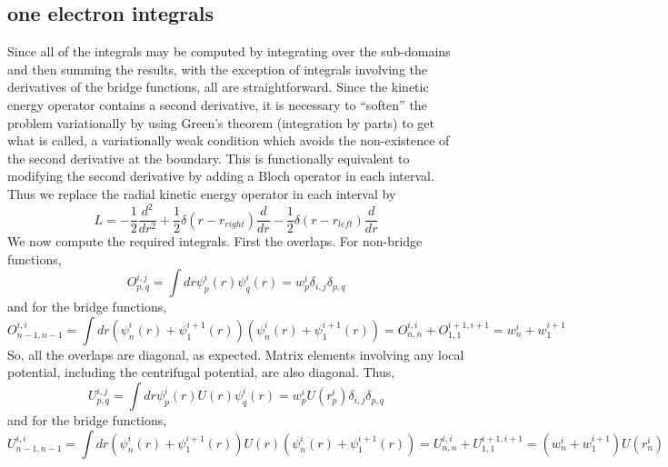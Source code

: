 \documentclass[preprint,showpacs,preprintnumbers,amsmath,amssymb]{revtex4}
\begin{document}
\subsection{one electron integrals}
Since all of the integrals may be computed by integrating over the 
sub-domains and then summing the results, with the exception of integrals 
involving the derivatives of the bridge functions, all are straightforward.
Since the kinetic energy operator contains a second derivative, it is 
necessary to ``soften'' the problem variationally by using Green's theorem 
(integration by parts) to get what is called, a variationally weak 
condition which avoids the non-existence of the second derivative at the 
boundary.  This is functionally equivalent to modifying the second 
derivative by adding a Bloch operator in each interval.  Thus we replace the
radial kinetic energy operator in each interval by
\begin{equation}
 L = -\frac{1}{2} \frac{d^2}{dr^{2}}  
                    + \frac{1}{2} \delta(r-r_{right}) \frac{d}{dr} 
                    - \frac{1}{2} \delta(r-r_{left}) \frac{d}{dr} 
\end{equation}
We now compute the required integrals.  First the overlaps.  For non-bridge 
functions,
\begin{equation}
    O^{i,j}_{p,q} = \int dr \psi^{i}_{p}(r) \psi^{i}_{q}(r)
                = w^{i}_{p} \delta_{i,j} \delta_{p,q}
\end{equation}
and for the bridge functions, 
\begin{equation}
        O^{i,i}_{n-1,n-1} = \int dr ( \psi^{i}_{n}(r) + \psi^{i+1}_{1}(r) )
                        ( \psi^{i}_{n}(r) + \psi^{i+1}_{1}(r) )
              = O^{i,i}_{n,n} + O^{i+1,i+1}_{1,1}
              = w^{i}_{n} + w^{i+1}_{1}
\end{equation}
So, all the overlaps are diagonal, as expected.
Matrix elements involving any local potential, including the centrifugal
potential, are also diagonal.  Thus,
\begin{equation}
    U^{i,j}_{p,q} = \int dr \psi^{i}_{p}(r) U(r) \psi^{i}_{q}(r)
                = w^{i}_{p} U(r^{i}_{p}) \delta_{i,j} \delta_{p,q}
\end{equation}
and for the bridge functions, 
\begin{equation}
        U^{i,i}_{n-1,n-1} = \int dr ( \psi^{i}_{n}(r) + \psi^{i+1}_{1}(r) )
                   U(r)  ( \psi^{i}_{n}(r) + \psi^{i+1}_{1}(r) )
              = U^{i,i}_{n,n} + U^{i+1,i+1}_{1,1}
              = ( w^{i}_{n} + w^{i+1}_{1} ) U(r^{i}_{n})
\end{equation}
\end{document}
